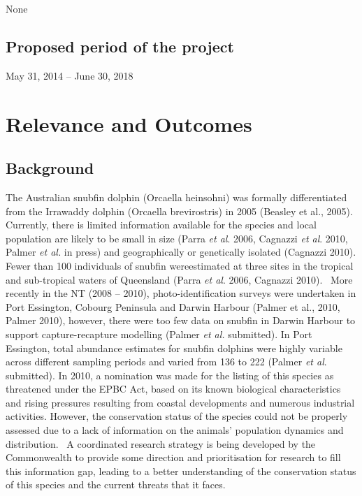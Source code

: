 \documentclass[version=last,
    paper=a4,                               %
    10pt,                                   %
    dvipsnames,
    oneside,                              %
    headings=openany,                       %
    open=any,
    BCOR=7mm,                               %
    DIV=15,     %
]{scrbook}
\begin{document}
None


\subsection*{Proposed period of the project}
May 31, 2014 -- June 30, 2018



\section*{Relevance and Outcomes}


\subsection*{Background}

The Australian snubfin dolphin (Orcaella heinsohni) was formally
differentiated from the Irrawaddy dolphin (Orcaella brevirostris) in
2005 (Beasley et al., 2005). Currently, there is limited information
available for the species and local population are likely to be small in
size (Parra \emph{et al}. 2006, Cagnazzi \emph{et al}. 2010, Palmer
\emph{et al.} in press) and geographically or genetically isolated
(Cagnazzi 2010). Fewer than 100 individuals of snubfin wereestimated at
three sites in the tropical and sub-tropical waters of Queensland (Parra
\emph{et al}. 2006, Cagnazzi 2010). ~More recently in the NT (2008 --
2010), photo-identification surveys were undertaken in Port Essington,
Cobourg Peninsula and Darwin Harbour (Palmer et al., 2010, Palmer 2010),
however, there were too few data on snubfin in Darwin Harbour to support
capture-recapture modelling (Palmer \emph{et al.} submitted). In Port
Essington, total abundance estimates for snubfin dolphins were highly
variable across different sampling periods and varied from 136 to 222
(Palmer \emph{et al}. submitted). In 2010, a nomination was made for the
listing of this species as threatened under the EPBC Act, based on its
known biological characteristics and rising pressures resulting from
coastal developments and numerous industrial activities. However, the
conservation status of the species could not be properly assessed due to
a lack of information on the animals' population dynamics and
distribution.~ A coordinated research strategy is being developed by the
Commonwealth to provide some direction and prioritisation for research
to fill this information gap, leading to a better understanding of the
conservation status of this species and the current threats that it
faces.
\end{document}
